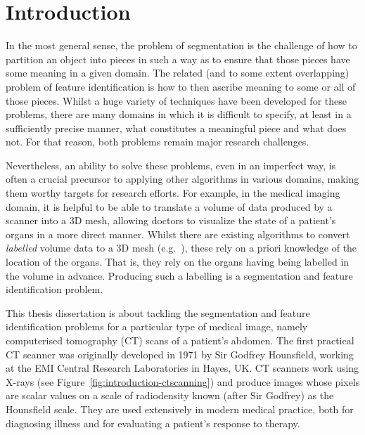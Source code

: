 \chapter{Introduction}
\label{chap:introduction}

In the most general sense, the problem of segmentation is the challenge of how to partition an object into pieces in such a way as to ensure that those pieces have some meaning in a given domain. The related (and to some extent overlapping) problem of feature identification is how to then ascribe meaning to some or all of those pieces. Whilst a huge variety of techniques have been developed for these problems, there are many domains in which it is difficult to specify, at least in a sufficiently precise manner, what constitutes a meaningful piece and what does not. For that reason, both problems remain major research challenges.

Nevertheless, an ability to solve these problems, even in an imperfect way, is often a crucial precursor to applying other algorithms in various domains, making them worthy targets for research efforts. For example, in the medical imaging domain, it is helpful to be able to translate a volume of data produced by a scanner into a 3D mesh, allowing doctors to visualize the state of a patient's organs in a more direct manner. Whilst there are existing algorithms to convert \emph{labelled} volume data to a 3D mesh (e.g.~\cite{wu03}), these rely on a priori knowledge of the location of the organs. That is, they rely on the organs having being labelled in the volume in advance. Producing such a labelling is a segmentation and feature identification problem.

This thesis dissertation is about tackling the segmentation and feature identification problems for a particular type of medical image, namely computerised tomography (CT) scans of a patient's abdomen. The first practical CT scanner was originally developed in 1971 by Sir Godfrey Hounsfield, working at the EMI Central Research Laboratories in Hayes, UK. CT scanners work using X-rays (see Figure~\ref{fig:introduction-ctscanning}) and produce images whose pixels are scalar values on a scale of radiodensity known (after Sir Godfrey) as the Hounsfield scale. They are used extensively in modern medical practice, both for diagnosing illness and for evaluating a patient's response to therapy.

